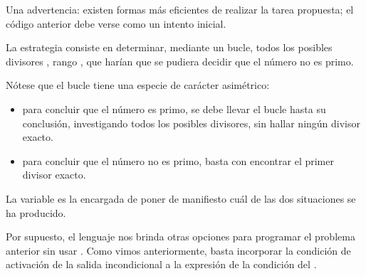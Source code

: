 \documentclass[letterpaper,10pt,english]{sphinxmanual}
\begin{document}
Una advertencia: existen formas más eficientes de realizar la tarea propuesta;
el código anterior debe verse como un intento inicial.

La estrategia consiste en determinar, mediante un bucle, todos los posibles
divisores , rango , que harían que se pudiera
decidir que el número no es primo.

Nótese que el bucle tiene una especie de carácter asimétrico:
\begin{itemize}
\item {} 
para concluir que el número es primo, se debe llevar el bucle hasta su
conclusión, investigando todos los posibles divisores, sin hallar ningún
divisor exacto.

\item {} 
para concluir que el número no es primo, basta con encontrar el primer
divisor exacto.

\end{itemize}

La variable   es la encargada de poner de
manifiesto cuál de las dos situaciones se ha producido.

\newpage

Por supuesto, el lenguaje nos brinda otras opciones para programar
el problema anterior sin usar . Como vimos anteriormente,
basta incorporar la condición de activación de la salida incondicional
a la expresión de la condición del .

\end{document}
